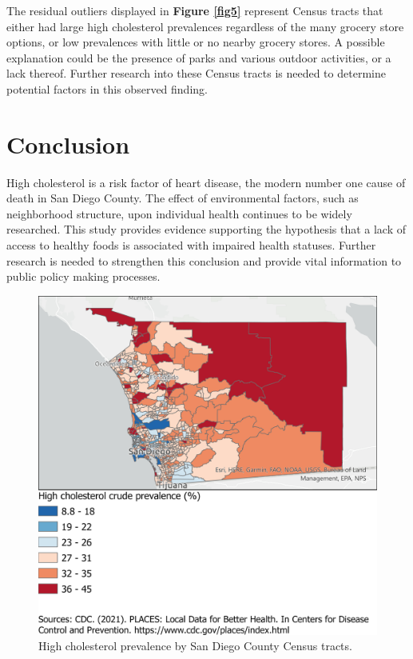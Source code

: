 \documentclass[]{elsarticle} %
\begin{document}
The residual outliers displayed in \textbf{Figure \ref{fig5}} represent
Census tracts that either had large high cholesterol prevalences
regardless of the many grocery store options, or low prevalences with
little or no nearby grocery stores. A possible explanation could be the
presence of parks and various outdoor activities, or a lack thereof.
Further research into these Census tracts is needed to determine
potential factors in this observed finding.

\hypertarget{conclusion}{%
\section{Conclusion}\label{conclusion}}

High cholesterol is a risk factor of heart disease, the modern number
one cause of death in San Diego County. The effect of environmental
factors, such as neighborhood structure, upon individual health
continues to be widely researched. This study provides evidence
supporting the hypothesis that a lack of access to healthy foods is
associated with impaired health statuses. Further research is needed to
strengthen this conclusion and provide vital information to public
policy making processes.

\pagebreak

\begin{figure}
\centering
\includegraphics{"../map1.png"}
\caption{High cholesterol prevalence by San Diego County Census
tracts.\label{fig1}}
\end{figure}
\end{document}
